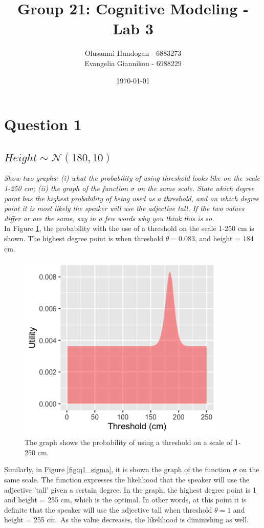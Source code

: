 \documentclass[11pt,a4paper,oneside]{article}
\title{\textbf{Group 21: Cognitive Modeling - Lab 3}}
\date{\today}
\author{Olusanmi Hundogan - 6883273\\
Evangelia Giannikou - 6988229\\
}
\begin{document}
\maketitle

\section{Question 1}
\label{Q1}
\subsection{$Height \sim \mathcal{N}(180, 10)$}
\textit{Show two graphs: (i) what the probability of using threshold looks like on the scale 1-250 cm; (ii) the graph of the function $\sigma$ on the same scale. State which degree point has the highest probability of being used as a threshold, and on which degree point it is most likely the speaker will use the adjective tall. If the two values differ or are the same, say in a few words why you think this is so.}\\

In Figure \ref{fig:q1_threshold}, the probability with the use of a threshold on the scale 1-250 cm is shown. The highest degree point is when threshold $ \theta = 0.083$, and height = 184 cm.

\begin{figure}[H]
    \centering
    \includegraphics[width=100mm]{figs/Question_1_threshold.png}
    \caption{The graph shows the probability of using a threshold on a scale of 1-250 cm.}
  \label{fig:q1_threshold}
\end{figure}

Similarly, in Figure \ref{fig:q1_sigma}, it is shown the graph of the function $\sigma$ on the same scale. The function expresses the likelihood that the speaker will use the adjective 'tall' given a certain degree. In the graph, the highest degree point is 1 and height = 255 cm, which is the optimal. In other words, at this point it is definite that the speaker will use the adjective tall when threshold $ \theta = 1$ and height = 255 cm. As the value decreases, the likelihood is diminishing as well.
\end{document}
